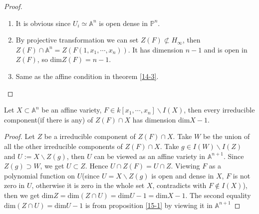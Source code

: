 \begin{proof}
	\begin{enumerate}
		\item It is obvious since $ U_i\simeq \mathbb{A}^n $ is open dense in $ \mathbb{P}^n $.
		\item By projective transformation we can set $ Z(F)\not\subset H_{\infty} $, then $ Z(F)\cap \mathbb{A}^n=Z(F(1,x_1,\cdots,x_n)) $. It has dimension $ n-1 $ and is open in $ Z(F) $, so $ \mathrm{dim}Z(F)=n-1 $.
		\item Same as the affine condition in theorem \ref{14-3}.
	\end{enumerate}
\end{proof}
\begin{theorem}\label{15-3}
	Let $ X\subset \mathbb{A}^n $ be an affine variety, $ F\in k[x_1,\cdots,x_n]\backslash I(X) $, then every irreducible component(if there is any) of $ Z(F)\cap X $ has dimension $ \mathrm{dim}X-1 $.
\end{theorem}
\begin{proof}
	Let $ Z $ be a irreducible component of $ Z(F)\cap X $. Take $ W $ be the union of all the other irreducible components of $ Z(F)\cap X $. Take $ g\in I(W)\backslash I(Z) $ and $ U:=X\backslash Z(g) $, then $ U $ can be viewed as an affine variety in $ \mathbb{A}^{n+1} $. Since $ Z(g)\supset W $, we get $ U\subset Z $. Hence $ U\cap Z(F)=U\cap Z $. Viewing  $ F $ as a polynomial function on $ U $(since $ U=X\backslash Z(g) $ is open and dense in $ X $, $ F $ is not zero in $ U $, otherwise it is zero in the whole set $ X $, contradicts with  $ F\notin I(X) $), then we get
	$ \mathrm{dim}Z=\mathrm{dim}(Z\cap U)=\mathrm{dim}U-1=\mathrm{dim}X-1 $. The second equality $ \mathrm{dim}(Z\cap U)=\mathrm{dim}U-1 $ is from  proposition \ref{15-1} by viewing it in $ \mathbb{A}^{n+1} $
\end{proof}

